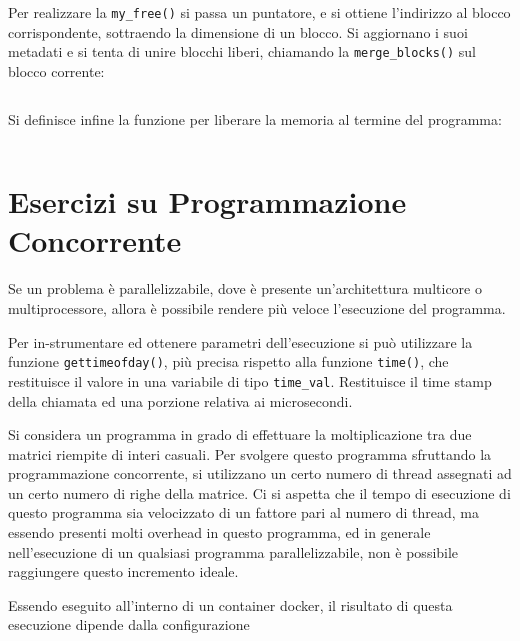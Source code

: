 \documentclass{article}
\numberwithin{equation}{subsection}
\begin{document}
Per realizzare la \verb|my_free()| si passa un puntatore, e si ottiene l'indirizzo al blocco corrispondente, sottraendo la dimensione di un blocco. Si aggiornano i suoi metadati e si tenta di unire blocchi liberi, chiamando la \verb|merge_blocks()| sul blocco corrente:
\inputminted[firstline=98,lastline=107]{c}{./"Esercitazione del 19-11-24"/domanda4.c}

Si definisce infine la funzione per liberare la memoria al termine del programma:
\inputminted[firstline=109,lastline=116]{c}{./"Esercitazione del 19-11-24"/domanda4.c}

\clearpage

\section{Esercizi su Programmazione Concorrente}


Se un problema è parallelizzabile, dove è presente un'architettura multicore o multiprocessore, allora è possibile rendere più veloce 
l'esecuzione del programma. 

Per in-strumentare ed ottenere parametri dell'esecuzione si può utilizzare la funzione \verb|gettimeofday()|, più precisa rispetto alla funzione \verb|time()|, 
che restituisce il valore in una variabile di tipo \verb|time_val|. Restituisce il time stamp della chiamata ed una porzione relativa ai microsecondi. 


Si considera un programma in grado di effettuare la moltiplicazione tra due matrici riempite di interi casuali. Per svolgere questo programma sfruttando la 
programmazione concorrente, si utilizzano un certo numero di thread assegnati ad un certo numero di righe della matrice. Ci si aspetta che il tempo di esecuzione 
di questo programma sia velocizzato di un fattore pari al numero di thread, ma essendo presenti molti overhead in questo programma, ed in generale nell'esecuzione di 
un qualsiasi programma parallelizzabile, non è possibile raggiungere questo incremento ideale. 


Essendo eseguito all'interno di un container docker, il risultato di questa esecuzione dipende dalla configurazione 
\end{document}
